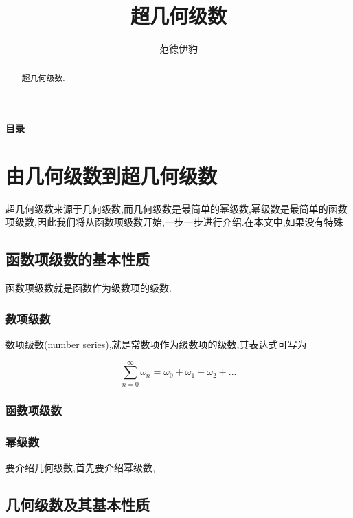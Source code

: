 \documentclass[zihao=-4,a4paper]{ctexart}
\title{超几何级数}
\author[$\dagger$]{\kaishu 范德伊豹}
\affil[$\dagger$]{\kaishu 上海理工大学物理系}
\begin{document}
\maketitle
\begin{abstract}
	超几何级数.
\end{abstract}
{\centering \Large\bfseries 目录 \par}
\begin{multicols}{1}
    \tableofcontents
\end{multicols}


\section{由几何级数到超几何级数}

超几何级数来源于几何级数,而几何级数是最简单的幂级数,幂级数是最简单的函数项级数,因此我们将从函数项级数开始,一步一步进行介绍.在本文中,如果没有特殊

\subsection{函数项级数的基本性质}

函数项级数就是函数作为级数项的级数.

\subsubsection{数项级数}

数项级数(number series),就是常数项作为级数项的级数,其表达式可写为

\begin{equation}
	\sum^{\infty}_{n=0} {\omega}_{n} = {\omega}_{0} + {\omega}_{1} + {\omega}_{2} + ...
\end{equation}
	
\subsubsection{函数项级数}

\subsubsection{幂级数}
要介绍几何级数,首先要介绍幂级数,

\subsection{几何级数及其基本性质}
\end{document}
